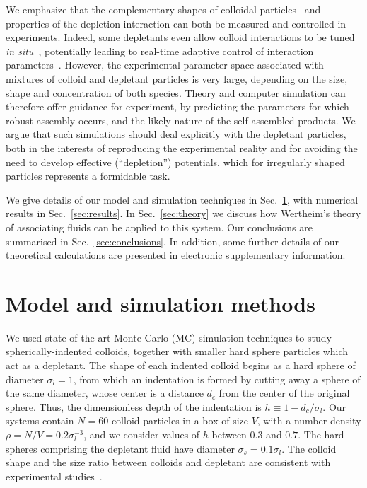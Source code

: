 \documentclass[10pt,onside,singlecolumn]{article}
\begin{document}
We emphasize that the complementary shapes of colloidal particles~\cite{Sacanna:2010ys,Sacanna2011,Bahadur2012} and
properties of the depletion interaction can both be measured and controlled
in experiments.  Indeed, some depletants even allow colloid
interactions to be tuned \emph{in
situ}~\cite{Alsayed04,Savage09,Rossi11}, potentially leading to
real-time adaptive control of interaction
parameters~\cite{Klotsa:2013vn}.  However, the experimental parameter
space associated with mixtures of colloid and depletant particles is
very large, depending on the size, shape and concentration of both
species.  Theory and computer simulation can therefore offer
guidance for experiment, by predicting the parameters for which robust
assembly occurs, and the likely nature of the self-assembled products.
We argue that such simulations should deal explicitly with the
depletant particles, both in the interests of reproducing the
experimental reality and for avoiding the need to develop effective
(``depletion'') potentials, which for irregularly shaped particles
represents a formidable task.

We give details of our model and simulation techniques in Sec.~\ref{sec:simdetails},
with numerical results in Sec.~\ref{sec:results}.  In Sec.~\ref{sec:theory} we discuss
how Wertheim's theory of associating fluids can be applied to this system.  Our
conclusions are summarised in Sec.~\ref{sec:conclusions}.  In addition, some further
details of our theoretical calculations are presented in electronic supplementary information.

\section{Model and simulation methods} \label{sec:simdetails}

We used state-of-the-art Monte Carlo (MC) simulation
techniques to study spherically-indented colloids, together with
smaller hard sphere particles which act as a depletant.  The shape of
each indented colloid begins as a hard sphere of diameter
$\sigma_l=1$, from which an indentation is formed by cutting away a
sphere of the same diameter, whose center is a distance $d_c$ from the
center of the original sphere.  Thus, the dimensionless depth of the
indentation is $h\equiv 1 - d_c/\sigma_l$. Our systems contain $N=60$
colloid particles in a box of size $V$, with a number density
$\rho=N/V=0.2\sigma_l^{-3}$, and we consider values of $h$ between
$0.3$ and $0.7$.  The hard spheres comprising the depletant fluid have
diameter $\sigma_s=0.1\sigma_l$.  The colloid shape and the size ratio
between colloids and depletant are consistent with experimental
studies~\cite{Sacanna:2010ys}.
\end{document}
